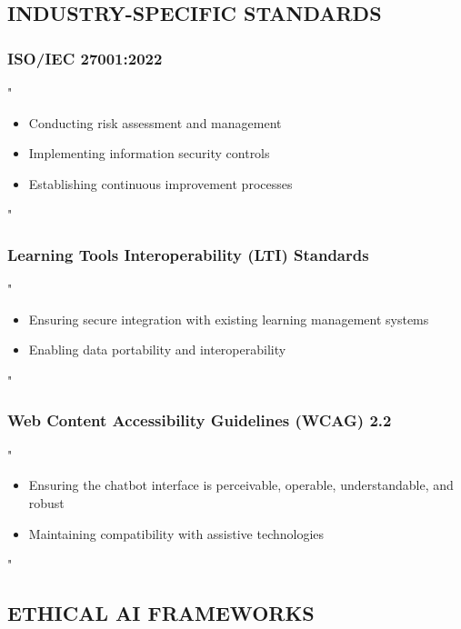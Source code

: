 \documentclass[14pt,a4paper]{article}
\begin{document}
\textit{\parencite[pp. 2-5]{IEEE2024}}


\subsection*{INDUSTRY-SPECIFIC STANDARDS}

\subsubsection*{ISO/IEC 27001:2022}
"
\begin{itemize}
    \item Conducting risk assessment and management
    \item Implementing information security controls
    \item Establishing continuous improvement processes
\end{itemize}
"

\textit{\parencite{ISO2022}}


\subsubsection*{Learning Tools Interoperability (LTI) Standards}
"
\begin{itemize}
    \item Ensuring secure integration with existing learning management systems
    \item Enabling data portability and interoperability
\end{itemize}
"

\textit{\parencite{IMSGlobal2024}}


\subsubsection*{Web Content Accessibility Guidelines (WCAG) 2.2}
"
\begin{itemize}
    \item Ensuring the chatbot interface is perceivable, operable, understandable, and robust
    \item Maintaining compatibility with assistive technologies
\end{itemize}
"

\textit{\parencite{W3C2023}}

\subsection*{ETHICAL AI FRAMEWORKS}
\end{document}
